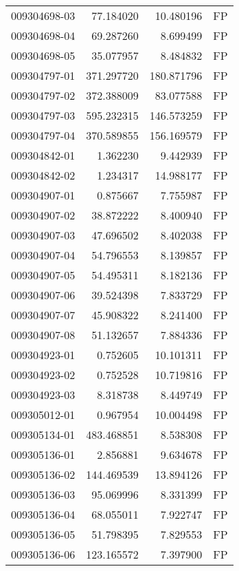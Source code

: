 \begin{tabular}{lrrl}
009304698-03 &   77.184020 &      10.480196 &   FP \\
009304698-04 &   69.287260 &       8.699499 &   FP \\
009304698-05 &   35.077957 &       8.484832 &   FP \\
009304797-01 &  371.297720 &     180.871796 &   FP \\
009304797-02 &  372.388009 &      83.077588 &   FP \\
009304797-03 &  595.232315 &     146.573259 &   FP \\
009304797-04 &  370.589855 &     156.169579 &   FP \\
009304842-01 &    1.362230 &       9.442939 &   FP \\
009304842-02 &    1.234317 &      14.988177 &   FP \\
009304907-01 &    0.875667 &       7.755987 &   FP \\
009304907-02 &   38.872222 &       8.400940 &   FP \\
009304907-03 &   47.696502 &       8.402038 &   FP \\
009304907-04 &   54.796553 &       8.139857 &   FP \\
009304907-05 &   54.495311 &       8.182136 &   FP \\
009304907-06 &   39.524398 &       7.833729 &   FP \\
009304907-07 &   45.908322 &       8.241400 &   FP \\
009304907-08 &   51.132657 &       7.884336 &   FP \\
009304923-01 &    0.752605 &      10.101311 &   FP \\
009304923-02 &    0.752528 &      10.719816 &   FP \\
009304923-03 &    8.318738 &       8.449749 &   FP \\
009305012-01 &    0.967954 &      10.004498 &   FP \\
009305134-01 &  483.468851 &       8.538308 &   FP \\
009305136-01 &    2.856881 &       9.634678 &   FP \\
009305136-02 &  144.469539 &      13.894126 &   FP \\
009305136-03 &   95.069996 &       8.331399 &   FP \\
009305136-04 &   68.055011 &       7.922747 &   FP \\
009305136-05 &   51.798395 &       7.829553 &   FP \\
009305136-06 &  123.165572 &       7.397900 &   FP \\

\end{tabular}
